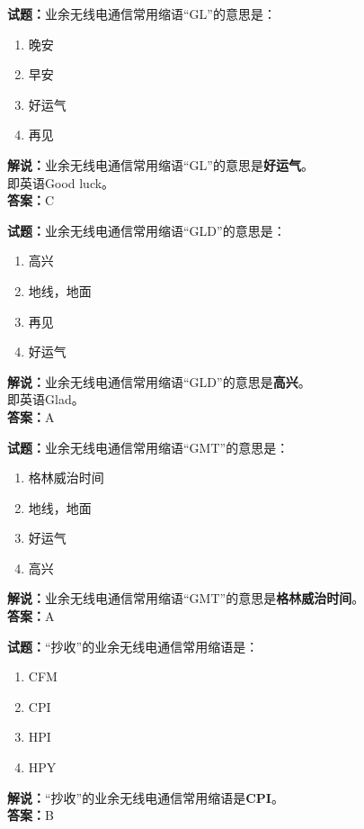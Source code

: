 \documentclass{ctexbook}
\begin{document}
\bigskip


\noindent\textbf{试题：}业余无线电通信常用缩语“GL”的意思是：
\begin{enumerate}[leftmargin=3em]
\item 晚安
\item 早安
\item 好运气
\item 再见
\end{enumerate}
\noindent\textbf{解说：}业余无线电通信常用缩语“GL”的意思是\textbf{好运气}。\\即英语Good luck。\\\noindent\textbf{答案：}C



\bigskip


\noindent\textbf{试题：}业余无线电通信常用缩语“GLD”的意思是：
\begin{enumerate}[leftmargin=3em]
\item 高兴
\item 地线，地面
\item 再见
\item 好运气
\end{enumerate}
\noindent\textbf{解说：}业余无线电通信常用缩语“GLD”的意思是\textbf{高兴}。\\即英语Glad。\\\noindent\textbf{答案：}A



\bigskip


\noindent\textbf{试题：}业余无线电通信常用缩语“GMT”的意思是：
\begin{enumerate}[leftmargin=3em]
\item 格林威治时间
\item 地线，地面
\item 好运气
\item 高兴
\end{enumerate}
\noindent\textbf{解说：}业余无线电通信常用缩语“GMT”的意思是\textbf{格林威治时间}。\\\noindent\textbf{答案：}A



\bigskip


\noindent\textbf{试题：}“抄收”的业余无线电通信常用缩语是：
\begin{enumerate}[leftmargin=3em]
\item CFM
\item CPI
\item HPI
\item HPY
\end{enumerate}
\noindent\textbf{解说：}“抄收”的业余无线电通信常用缩语是\textbf{CPI}。\\\noindent\textbf{答案：}B
\end{document}

